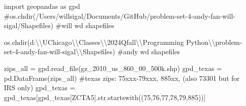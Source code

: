 \documentclass[
  letterpaper,
  DIV=11,
  numbers=noendperiod]{scrartcl}
\newenvironment{Shaded}{\begin{snugshade}}{\end{snugshade}}
\newcommand{\BuiltInTok}[1]{\textcolor[rgb]{0.00,0.23,0.31}{#1}}
\newcommand{\CharTok}[1]{\textcolor[rgb]{0.13,0.47,0.30}{#1}}
\newcommand{\CommentTok}[1]{\textcolor[rgb]{0.37,0.37,0.37}{#1}}
\newcommand{\ImportTok}[1]{\textcolor[rgb]{0.00,0.46,0.62}{#1}}
\newcommand{\NormalTok}[1]{\textcolor[rgb]{0.00,0.23,0.31}{#1}}
\newcommand{\OperatorTok}[1]{\textcolor[rgb]{0.37,0.37,0.37}{#1}}
\newcommand{\StringTok}[1]{\textcolor[rgb]{0.13,0.47,0.30}{#1}}
\begin{document}
\begin{Shaded}
\begin{Highlighting}[]
\ImportTok{import}\NormalTok{ geopandas }\ImportTok{as}\NormalTok{ gpd}
\CommentTok{\#os.chdir(\textquotesingle{}/Users/willsigal/Documents/GitHub/problem{-}set{-}4{-}andy{-}fan{-}will{-}sigal/Shapefiles\textquotesingle{}) \#will wd shapefiles}

\NormalTok{os.chdir(}\StringTok{\textquotesingle{}d:}\CharTok{\textbackslash{}\textbackslash{}}\StringTok{UChicago}\CharTok{\textbackslash{}\textbackslash{}}\StringTok{Classes}\CharTok{\textbackslash{}\textbackslash{}}\StringTok{2024Qfall}\CharTok{\textbackslash{}\textbackslash{}}\StringTok{Programming Python}\CharTok{\textbackslash{}\textbackslash{}}\StringTok{problem{-}set{-}4{-}andy{-}fan{-}will{-}sigal}\CharTok{\textbackslash{}\textbackslash{}}\StringTok{Shapefiles\textquotesingle{}}\NormalTok{) }\CommentTok{\#andy wd shapefiles}

\NormalTok{zips\_all }\OperatorTok{=}\NormalTok{ gpd.read\_file(}\StringTok{\textquotesingle{}gz\_2010\_us\_860\_00\_500k.shp\textquotesingle{}}\NormalTok{)}
\NormalTok{gpd\_texas }\OperatorTok{=}\NormalTok{ pd.DataFrame(zips\_all)}
\CommentTok{\#texas zips: 75xxx{-}79xxx, 885xx, (also 73301 but for IRS only)}
\NormalTok{gpd\_texas }\OperatorTok{=}\NormalTok{ gpd\_texas[gpd\_texas[}\StringTok{\textquotesingle{}ZCTA5\textquotesingle{}}\NormalTok{].}\BuiltInTok{str}\NormalTok{.startswith((}\StringTok{\textquotesingle{}75\textquotesingle{}}\NormalTok{,}\StringTok{\textquotesingle{}76\textquotesingle{}}\NormalTok{,}\StringTok{\textquotesingle{}77\textquotesingle{}}\NormalTok{,}\StringTok{\textquotesingle{}78\textquotesingle{}}\NormalTok{,}\StringTok{\textquotesingle{}79\textquotesingle{}}\NormalTok{,}\StringTok{\textquotesingle{}885\textquotesingle{}}\NormalTok{))]}
\end{Highlighting}
\end{Shaded}
\end{document}
